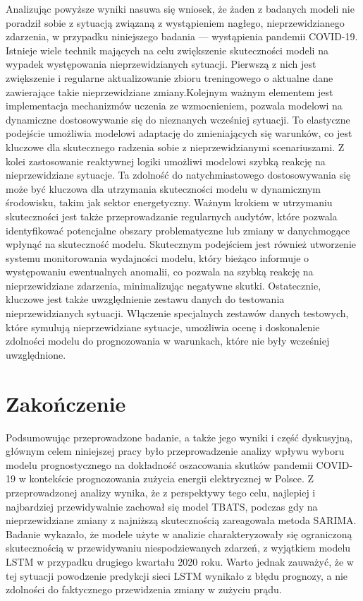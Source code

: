 \documentclass[polish, twoside, 12pt, a4paper]{article}
\theoremstyle{definition}
\theoremstyle{plain}
\theoremstyle{remark}
\begin{document}
Analizując powyższe wyniki nasuwa się wniosek, że żaden z badanych modeli nie poradził sobie z sytuacją związaną z wystąpieniem nagłego, nieprzewidzianego zdarzenia, w przypadku niniejszego badania --- wystąpienia pandemii COVID-19. Istnieje wiele technik mających na celu zwiększenie skuteczności modeli na wypadek występowania nieprzewidzianych sytuacji. Pierwszą z nich jest zwiększenie i regularne aktualizowanie zbioru treningowego o aktualne dane zawierające takie nieprzewidziane zmiany.Kolejnym ważnym elementem jest implementacja mechanizmów uczenia ze wzmocnieniem, pozwala modelowi na dynamiczne dostosowywanie się do nieznanych wcześniej sytuacji. To elastyczne podejście umożliwia modelowi adaptację do zmieniających się warunków, co jest kluczowe dla skutecznego radzenia sobie z nieprzewidzianymi scenariuszami. Z kolei zastosowanie reaktywnej logiki umożliwi modelowi szybką reakcję na nieprzewidziane sytuacje. Ta zdolność do natychmiastowego dostosowywania się może być kluczowa dla utrzymania skuteczności modelu w dynamicznym środowisku, takim jak sektor energetyczny. Ważnym krokiem w utrzymaniu skuteczności jest także przeprowadzanie regularnych audytów, które pozwala identyfikować potencjalne obszary problematyczne lub zmiany w danychmogące wpłynąć na skuteczność modelu. Skutecznym podejściem jest również utworzenie systemu monitorowania wydajności modelu, który bieżąco informuje o występowaniu ewentualnych anomalii, co pozwala na szybką reakcję na nieprzewidziane zdarzenia, minimalizując negatywne skutki. Ostatecznie, kluczowe jest także uwzględnienie zestawu danych do testowania nieprzewidzianych sytuacji. Włączenie specjalnych zestawów danych testowych, które symulują nieprzewidziane sytuacje, umożliwia ocenę i doskonalenie zdolności modelu do prognozowania w warunkach, które nie były wcześniej uwzględnione. 

\clearpage
\section{Zakończenie}\label{sec:zakonczenie}

Podsumowując przeprowadzone badanie, a także jego wyniki i część dyskusyjną, głównym celem niniejszej pracy było przeprowadzenie analizy wpływu wyboru modelu prognostycznego na dokładność oszacowania skutków pandemii COVID-19 w kontekście prognozowania zużycia energii elektrycznej w Polsce. Z przeprowadzonej analizy wynika, że z perspektywy tego celu, najlepiej i najbardziej przewidywalnie zachował się model TBATS, podczas gdy na nieprzewidziane zmiany z najniższą skutecznością zareagowała metoda SARIMA. Badanie wykazało, że modele użyte w analizie charakteryzowały się ograniczoną skutecznością w przewidywaniu niespodziewanych zdarzeń, z wyjątkiem modelu LSTM w przypadku drugiego kwartału 2020 roku. Warto jednak zauważyć, że w tej sytuacji powodzenie predykcji sieci LSTM wynikało z błędu prognozy, a nie zdolności do faktycznego przewidzenia zmiany w zużyciu prądu. 
\end{document}
